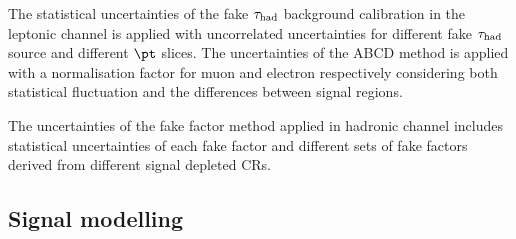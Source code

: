 



The statistical uncertainties of the fake $\tau_{\mathrm{had}}$ background calibration in the leptonic channel is applied with uncorrelated uncertainties for different fake $\tau_{\mathrm{had}}$ source and different $\pt$ slices. The uncertainties of the ABCD method is applied with a normalisation factor for muon and electron respectively considering both statistical fluctuation and the differences between signal regions.

The uncertainties of the fake factor method applied in hadronic channel includes statistical uncertainties of each fake factor and different sets of fake factors derived from different signal depleted CRs.

\subsection{Signal modelling}
\label{sec:syst_sigmodeling}

